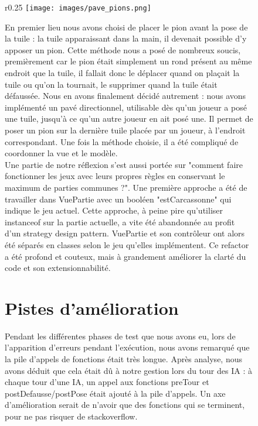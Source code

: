 \documentclass{article}
\begin{document}
\begin{figure}[t]
    
\begin{wrapfigure}{r}{0.25\textwidth} 
    \centering
    \texttt{[image: images/pave\_pions.png]}
\end{wrapfigure}

En premier lieu nous avons choisi de placer le pion avant la pose de la tuile : la tuile apparaissant dans la main, il devenait possible d'y apposer un pion. Cette méthode nous a posé de nombreux soucis, premièrement car le pion était simplement un rond présent au même endroit que la tuile, il fallait donc le déplacer quand on plaçait la tuile ou qu'on la tournait, le supprimer quand la tuile était défaussée. Nous en avons finalement décidé autrement : nous avons implémenté un pavé directionnel, utilisable dès qu'un joueur a posé une tuile, jusqu'à ce qu'un autre joueur en ait posé une. Il permet de poser un pion sur la dernière tuile placée par un joueur, à l'endroit correspondant. Une fois la méthode choisie, il a été compliqué de coordonner la vue et le modèle.\\

Une partie de notre réflexion s'est aussi portée sur "comment faire fonctionner les jeux avec leurs propres règles en conservant le maximum de parties communes ?". Une première approche a été de travailler dans VuePartie avec un booléen "estCarcassonne" qui indique le jeu actuel. Cette approche, à peine pire qu'utiliser instanceof sur la partie actuelle, a vite été abandonnée au profit d'un strategy design pattern. VuePartie et son contrôleur ont alors été séparés en classes selon le jeu qu'elles implémentent. Ce refactor a été profond et couteux, mais à grandement améliorer la clarté du code et son extensionnabilité.




\section{Pistes d'amélioration}

Pendant les différentes phases de test que nous avons eu, lors de l'apparition d'erreurs pendant l'exécution, nous avons remarqué que la pile d'appels de fonctions était très longue. Après analyse, nous avons déduit que cela était dû à notre gestion lors du tour des IA : à chaque tour d'une IA, un appel aux fonctions preTour et postDefausse/postPose était ajouté à  la pile d'appels. Un axe d'amélioration serait de n'avoir que des fonctions qui se terminent, pour ne pas risquer de stackoverflow.
\\


\end{figure}
\end{document}
